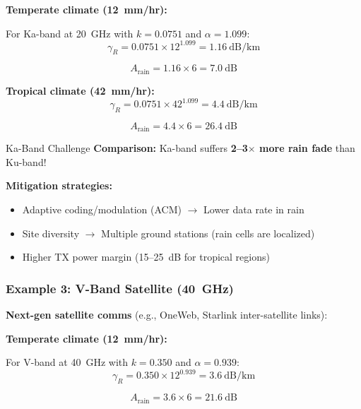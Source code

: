 \textbf{Temperate climate (12~mm/hr):}

For Ka-band at 20~GHz with $k = 0.0751$ and $\alpha = 1.099$:
\begin{equation}
\gamma_R = 0.0751 \times 12^{1.099} = 1.16~\text{dB/km}
\end{equation}

\begin{equation}
A_{\text{rain}} = 1.16 \times 6 = 7.0~\text{dB}
\end{equation}

\textbf{Tropical climate (42~mm/hr):}
\begin{equation}
\gamma_R = 0.0751 \times 42^{1.099} = 4.4~\text{dB/km}
\end{equation}

\begin{equation}
A_{\text{rain}} = 4.4 \times 6 = 26.4~\text{dB}
\end{equation}

\begin{calloutbox}{Ka-Band Challenge}
\textbf{Comparison:} Ka-band suffers \textbf{2--3$\times$ more rain fade} than Ku-band!

\textbf{Mitigation strategies:}
\begin{itemize}
\item Adaptive coding/modulation (ACM) $\rightarrow$ Lower data rate in rain
\item Site diversity $\rightarrow$ Multiple ground stations (rain cells are localized)
\item Higher TX power margin (15--25~dB for tropical regions)
\end{itemize}
\end{calloutbox}

\subsubsection{Example 3: V-Band Satellite (40~GHz)}

\textbf{Next-gen satellite comms} (e.g., OneWeb, Starlink inter-satellite links):

\textbf{Temperate climate (12~mm/hr):}

For V-band at 40~GHz with $k = 0.350$ and $\alpha = 0.939$:
\begin{equation}
\gamma_R = 0.350 \times 12^{0.939} = 3.6~\text{dB/km}
\end{equation}

\begin{equation}
A_{\text{rain}} = 3.6 \times 6 = 21.6~\text{dB}
\end{equation}

